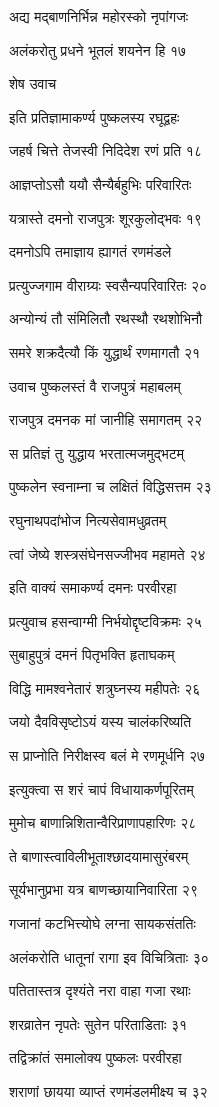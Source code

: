 अद्य मद्बाणनिर्भिन्न महोरस्को नृपांगजः

अलंकरोतु प्रधने भूतलं शयनेन हि १७

शेष उवाच

इति प्रतिज्ञामाकर्ण्य पुष्कलस्य रघूद्वहः

जहर्ष चित्ते तेजस्वी निदिदेश रणं प्रति १८

आज्ञप्तोऽसौ ययौ सैन्यैर्बहुभिः परिवारितः

यत्रास्ते दमनो राजपुत्रः शूरकुलोद्भवः १९

दमनोऽपि तमाज्ञाय ह्यागतं रणमंडले

प्रत्युज्जगाम वीराग्र्यः स्वसैन्यपरिवारितः २०

अन्योन्यं तौ संमिलितौ रथस्थौ रथशोभिनौ

समरे शक्रदैत्यौ किं युद्धार्थं रणमागतौ २१

उवाच पुष्कलस्तं वै राजपुत्रं महाबलम्

राजपुत्र दमनक मां जानीहि समागतम् २२

स प्रतिज्ञं तु युद्धाय भरतात्मजमुद्भटम्

पुष्कलेन स्वनाम्ना च लक्षितं विद्धिसत्तम २३

रघुनाथपदांभोज नित्यसेवामधुव्रतम्

त्वां जेष्ये शस्त्रसंघेनसज्जीभव महामते २४

इति वाक्यं समाकर्ण्य दमनः परवीरहा

प्रत्युवाच हसन्वाग्मी निर्भयोद्दृष्टविक्रमः २५

सुबाहुपुत्रं दमनं पितृभक्ति हृताघकम्

विद्धि मामश्वनेतारं शत्रुघ्नस्य महीपतेः २६

जयो दैवविसृष्टोऽयं यस्य चालंकरिष्यति

स प्राप्नोति निरीक्षस्व बलं मे रणमूर्धनि २७

इत्युक्त्वा स शरं चापं विधायाकर्णपूरितम्

मुमोच बाणान्निशितान्वैरिप्राणापहारिणः २८

ते बाणास्त्वाविलीभूताश्छादयामासुरंबरम्

सूर्यभानुप्रभा यत्र बाणच्छायानिवारिता २९

गजानां कटभित्त्योघे लग्ना सायकसंततिः

अलंकरोति धातूनां रागा इव विचित्रिताः ३०

पतितास्तत्र दृश्यंते नरा वाहा गजा रथाः

शरव्रातेन नृपतेः सुतेन परिताडिताः ३१

तद्विक्रांतं समालोक्य पुष्कलः परवीरहा

शराणां छायया व्याप्तं रणमंडलमीक्ष्य च ३२

